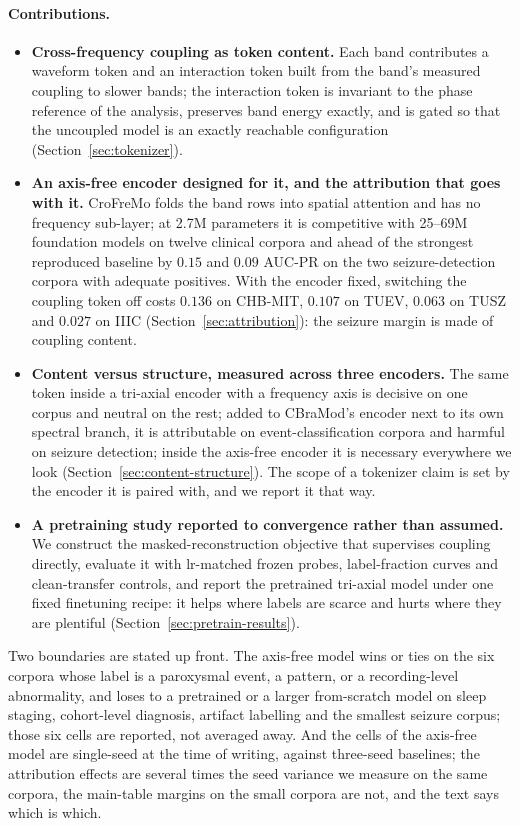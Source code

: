 \paragraph{Contributions.}
\begin{itemize}[leftmargin=*,itemsep=2pt,topsep=2pt]
\item \textbf{Cross-frequency coupling as token content.} Each band
  contributes a waveform token and an interaction token built from the
  band's measured coupling to slower bands; the interaction token is
  invariant to the phase reference of the analysis, preserves band energy
  exactly, and is gated so that the uncoupled model is an exactly
  reachable configuration (Section~\ref{sec:tokenizer}).
\item \textbf{An axis-free encoder designed for it, and the attribution
  that goes with it.} CroFreMo folds the band rows into spatial attention
  and has no frequency sub-layer; at 2.7M parameters it is competitive
  with 25--69M foundation models on twelve clinical corpora and ahead of
  the strongest reproduced baseline by $0.15$ and $0.09$ AUC-PR on the two
  seizure-detection corpora with adequate positives. With the encoder
  fixed, switching the coupling token off costs $0.136$ on CHB-MIT,
  $0.107$ on TUEV, $0.063$ on TUSZ and $0.027$ on IIIC
  (Section~\ref{sec:attribution}): the seizure margin is made of coupling
  content.
\item \textbf{Content versus structure, measured across three encoders.}
  The same token inside a tri-axial encoder with a frequency axis is
  decisive on one corpus and neutral on the rest; added to CBraMod's
  encoder next to its own spectral branch, it is attributable on
  event-classification corpora and harmful on seizure detection; inside
  the axis-free encoder it is necessary everywhere we look
  (Section~\ref{sec:content-structure}). The scope of a tokenizer claim is
  set by the encoder it is paired with, and we report it that way.
\item \textbf{A pretraining study reported to convergence rather than
  assumed.} We construct the masked-reconstruction objective that
  supervises coupling directly, evaluate it with lr-matched frozen probes,
  label-fraction curves and clean-transfer controls, and report the
  pretrained tri-axial model under one fixed finetuning recipe: it helps
  where labels are scarce and hurts where they are plentiful
  (Section~\ref{sec:pretrain-results}).
\end{itemize}

Two boundaries are stated up front. The axis-free model wins or ties on
the six corpora whose label is a paroxysmal event, a pattern, or a
recording-level abnormality, and loses to a pretrained or a larger
from-scratch model on sleep staging, cohort-level diagnosis, artifact
labelling and the smallest seizure corpus; those six cells are reported,
not averaged away. And the cells of the axis-free model are single-seed
at the time of writing, against three-seed baselines; the attribution
effects are several times the seed variance we measure on the same
corpora, the main-table margins on the small corpora are not, and the
text says which is which.
